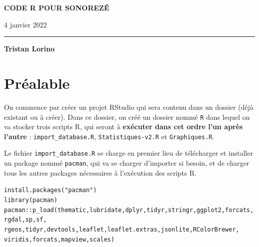 \documentclass[11pt]{article}\usepackage[]{graphicx}\usepackage[]{color}
\makeatletter
\newcommand{\hlstr}[1]{\textcolor[rgb]{0.063,0.58,0.627}{#1}}%
\newcommand{\hlopt}[1]{\textcolor[rgb]{0.196,0.196,0.196}{#1}}%
\newcommand{\hlstd}[1]{\textcolor[rgb]{0.196,0.196,0.196}{#1}}%
\newcommand{\hlkwd}[1]{\textcolor[rgb]{0.78,0.227,0.412}{#1}}%
\newenvironment{kframe}{%
 \def\at@end@of@kframe{}%
 \ifinner\ifhmode%
  \def\at@end@of@kframe{\end{minipage}}%
  \begin{minipage}{\columnwidth}%
 \fi\fi%
 \def\FrameCommand##1{\hskip\@totalleftmargin \hskip-\fboxsep
 \colorbox{shadecolor}{##1}\hskip-\fboxsep
     \hskip-\linewidth \hskip-\@totalleftmargin \hskip\columnwidth}%
 \MakeFramed {\advance\hsize-\width
   \@totalleftmargin\z@ \linewidth\hsize
   \@setminipage}}%
 {\par\unskip\endMakeFramed%
 \at@end@of@kframe}
\newenvironment{knitrout}{}{} %
\newcommand{\type}[1]{\textcolor{RedOrange}{\texttt{#1}}}
\makeatother
\begin{document}




\begin{center}
\vspace{-1.5cm}

\vspace{2cm}
{\Large \textbf{CODE R POUR SONOREZÉ}}


\vspace{4cm}
4 janvier 2022

\textcolor{RedOrange}{\rule{2.75cm}{.3pt}}

\vspace{.3cm}
{\large \textbf{Tristan Lorino}}
\end{center}
\thispagestyle{empty}

\vspace*{3cm}
\tableofcontents

\newpage
\section{Préalable}

On commence par créer un projet RStudio qui sera contenu dans un dossier (déjà existant ou à créer).
Dans ce dossier, on créé un dossier nommé \type{R} dans lequel on va stocker trois scripts R, qui seront à \textbf{exécuter dans cet ordre l'un après l'autre} : \type{import\_database.R}, \type{Statistiques-v2.R} et \type{Graphiques.R}.

Le fichier \type{import\_database.R} se charge en premier lieu de télécharger et installer un package nommé \type{pacman}, qui va se charger d'importer si besoin, et de charger tous les autres packages nécessaires à l'exécution des scripts R.

\begin{knitrout}\footnotesize
{}\color{fgcolor}\begin{kframe}
\begin{alltt}
\hlkwd{install.packages}\hlstd{(}\hlstr{"pacman"}\hlstd{)}
\hlkwd{library}\hlstd{(pacman)}
\hlstd{pacman}\hlopt{::}\hlkwd{p_load}\hlstd{(thematic,lubridate,dplyr,tidyr,stringr,ggplot2,forcats,rgdal,sp,sf,}
               \hlstd{rgeos,tidyr,devtools,leaflet,leaflet.extras,jsonlite,RColorBrewer,}
               \hlstd{viridis,forcats,mapview,scales)}
\end{alltt}
\end{kframe}
\end{knitrout}
\end{document}
